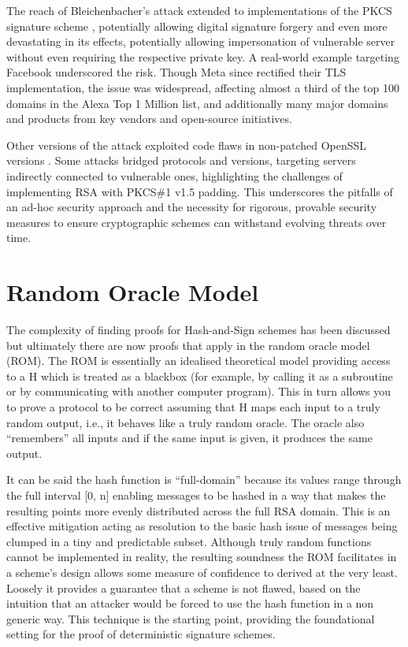 \documentclass[]{final_report}
\theoremstyle{definition}
\begin{document}
The reach of Bleichenbacher's attack extended to implementations of the PKCS signature scheme \cite{finney2006bleichenbacher, kuhn2008variants}, potentially allowing digital signature forgery and even more devastating in its effects, potentially allowing impersonation of vulnerable server without even requiring the respective private key. A real-world example targeting Facebook  \cite{bock2018return} underscored the risk. Though Meta since rectified their TLS implementation, the issue was widespread, affecting almost a third of the top 100 domains in the Alexa Top 1 Million list, and additionally many major domains and products from key vendors and open-source initiatives.

Other versions of the attack exploited code flaws in non-patched OpenSSL versions \cite{CVE-2006-4339}. Some attacks bridged protocols and versions, targeting servers indirectly connected to vulnerable ones, highlighting the challenges of implementing RSA with PKCS\#1 v1.5 padding. This underscores the pitfalls of an ad-hoc security approach and the necessity for rigorous, provable security measures to ensure cryptographic schemes can withstand evolving threats over time.


\section{Random Oracle Model}
\label{subSec:ROM}
The complexity of finding proofs for Hash-and-Sign schemes has been discussed but ultimately there are now proofs that apply in the random oracle model (ROM). The ROM \cite{10.1145/168588.168596} is essentially an idealised theoretical model providing access to a H which is treated as a blackbox (for example, by calling it as a subroutine or by communicating with another computer program). This in turn allows you to prove a protocol to be correct assuming that H maps each input to a truly random output, i.e., it behaves like a truly random oracle. 
The oracle also “remembers” all inputs and if the same input is given, it produces the same output. 

It can be said the hash function is “full-domain” because its values range through the full interval [0, n] enabling messages to be hashed in a way that makes the resulting points more evenly distributed across the full RSA domain. This is an effective mitigation acting as resolution to the basic hash issue of messages being clumped in a tiny and predictable subset. 
Although truly random functions cannot be implemented in reality, the resulting soundness the ROM facilitates in a scheme’s design allows some measure of confidence to derived at the very least. Loosely it provides a guarantee that a scheme is not flawed, based on the intuition that an attacker would be forced to use the hash function in a non generic way. This technique is the starting point, providing the foundational setting for the proof of deterministic signature schemes.
\end{document}
